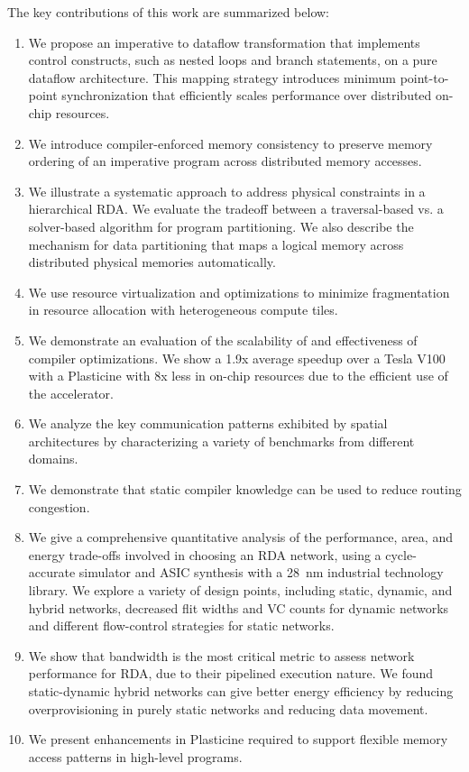 The key contributions of this work are summarized below:
\begin{enumerate}
    \item We propose an imperative to dataflow transformation that implements control constructs, such as nested loops and branch statements, on a pure dataflow architecture.
      This mapping strategy introduces minimum point-to-point synchronization that efficiently scales performance over distributed on-chip resources.
    \item We introduce compiler-enforced memory consistency to preserve memory ordering of an
      imperative program across distributed memory accesses.
    \item We illustrate a systematic approach to address physical constraints in a hierarchical RDA.
      We evaluate the tradeoff between a traversal-based vs. a solver-based algorithm for program partitioning.
      We also describe the mechanism for data partitioning that maps a logical memory across distributed physical
      memories automatically.
    \item We use resource virtualization and optimizations to minimize fragmentation in resource allocation with heterogeneous compute tiles.
    \item We demonstrate an evaluation of the scalability of \name and effectiveness of compiler optimizations.
      We show a 1.9x average speedup over a Tesla V100 with a Plasticine with 8x less in on-chip
      resources due to the efficient use of the accelerator.
    \item We analyze the key communication patterns exhibited by spatial architectures by characterizing a variety of benchmarks from different domains.
    \item We demonstrate that static compiler knowledge can be used to reduce routing congestion.
    \item We give a comprehensive quantitative analysis of the performance, area, and energy trade-offs
      involved in choosing an RDA network, using a cycle-accurate simulator and ASIC synthesis with a \SI{28}{nm} industrial technology library.
      We explore a variety of design points, including static, dynamic, and hybrid networks, decreased flit widths and VC counts for dynamic networks and different flow-control strategies for static networks.
    \item We show that bandwidth is the most critical metric to assess network performance for RDA,
      due to their pipelined execution nature. We found static-dynamic hybrid networks can give
      better energy efficiency by reducing overprovisioning in purely static networks and reducing
      data movement.
    \item We present enhancements in Plasticine required to support flexible memory access patterns
      in high-level programs.
\end{enumerate}

